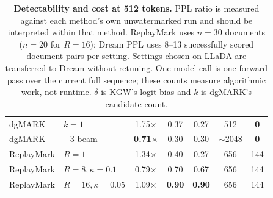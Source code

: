 \begin{table}[t]
\begin{tabular}{llccccc}
dgMARK \citep{hong2026dgmark} & $k=1$ & 1.75$\times$ & 0.37 & 0.27 & 512 & \textbf{0} \\  %
dgMARK \citep{hong2026dgmark} & $+3$-beam & \textbf{0.71}$\times$ & 0.30 & 0.30 & $\sim$2048 & \textbf{0} \\  %
\addlinespace[1.5pt]
\textcolor{oursemph}{ReplayMark} & $R=1$ & 1.34$\times$ & 0.40 & 0.27 & 656 & 144 \\
\textcolor{oursemph}{ReplayMark} & $R=8,\kappa=0.1$ & 0.79$\times$ & 0.70 & 0.67 & 656 & 144 \\
\rowcolor{finalres}
\textcolor{oursemph}{ReplayMark} & $R=16,\kappa=0.05$ & 1.09$\times$ & \textbf{0.90} & \textbf{0.90} & 656 & 144 \\
\bottomrule
\end{tabular}
\setlength{\abovecaptionskip}{3pt}
\caption{\textbf{Detectability and cost at 512 tokens.} PPL ratio is measured against each
method's own unwatermarked run and should be interpreted within that method. ReplayMark uses
$n=30$ documents ($n=20$ for $R=16$); Dream PPL uses 8--13 successfully scored document pairs
per setting. Settings chosen on LLaDA are transferred to Dream without retuning. One model call
is one forward pass over the current full sequence; these counts measure algorithmic work, not
runtime. $\delta$ is KGW's logit bias and $k$ is dgMARK's candidate count.}
\label{tab:baselines}
\end{table}
